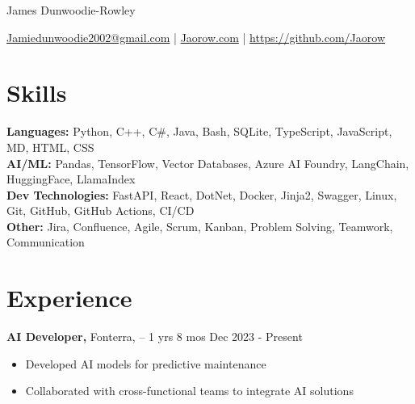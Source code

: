 \documentclass[11pt]{article}       %
\begin{document}
\centerline{\Huge James Dunwoodie-Rowley}

\vspace{5pt}


\centerline{\href{Jamiedunwoodie2002@gmail.com}{Jamiedunwoodie2002@gmail.com} | \href{Jaorow.com}{Jaorow.com} | \href{https://github.com/Jaorow}{https://github.com/Jaorow}}

\vspace{-10pt}



\section*{Skills}

\textbf{Languages:} Python, C++, C\#, Java, Bash, SQLite, TypeScript, JavaScript, MD, HTML, CSS \\

\textbf{AI/ML:} Pandas, TensorFlow, Vector Databases, Azure AI Foundry, LangChain, HuggingFace, LlamaIndex \\

\textbf{Dev Technologies:} FastAPI, React, DotNet, Docker, Jinja2, Swagger, Linux, Git, GitHub, GitHub Actions, CI/CD \\

\textbf{Other:} Jira, Confluence, Agile, Scrum, Kanban, Problem Solving, Teamwork, Communication \\



\vspace{-6.5pt}


\section*{Experience}

\textbf{AI Developer,} {Fonterra,} -- 1 yrs 8 mos \hfill Dec 2023 - Present \\
\vspace{-9pt}
\begin{itemize}
    
        \item Developed AI models for predictive maintenance
    
        \item Collaborated with cross-functional teams to integrate AI solutions
    
\end{itemize}
\end{document}
